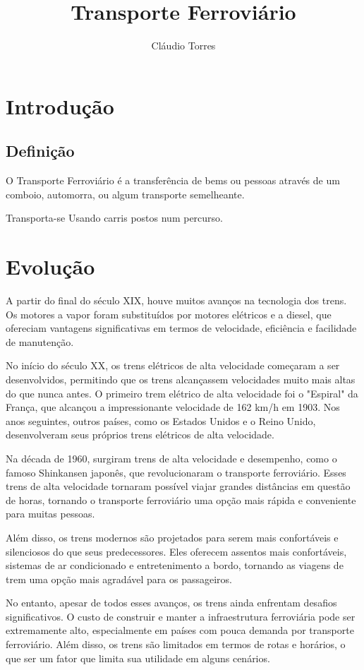 \documentclass{report}
\author{Cl\'audio Torres}
\title{Transporte Ferroviário}
\begin{document}
\maketitle
\section{Introdu\c c\~ao}
\subsection{Defini\c c\~ao}
O Transporte Ferroviário \' e a transferência de bems ou pessoas atrav\' es de um comboio, automorra, ou algum transporte semelheante.

Transporta-se Usando carris postos num percurso.
\section{Evolu\c c\~ao}
A partir do final do século XIX, houve muitos avanços na tecnologia dos trens. Os motores a vapor foram substituídos por motores elétricos e a diesel, que ofereciam vantagens significativas em termos de velocidade, eficiência e facilidade de manutenção.

No início do século XX, os trens elétricos de alta velocidade começaram a ser desenvolvidos, permitindo que os trens alcançassem velocidades muito mais altas do que nunca antes. O primeiro trem elétrico de alta velocidade foi o "Espiral" da França, que alcançou a impressionante velocidade de 162 km/h em 1903. Nos anos seguintes, outros países, como os Estados Unidos e o Reino Unido, desenvolveram seus próprios trens elétricos de alta velocidade.

Na década de 1960, surgiram trens de alta velocidade e desempenho, como o famoso Shinkansen japonês, que revolucionaram o transporte ferroviário. Esses trens de alta velocidade tornaram possível viajar grandes distâncias em questão de horas, tornando o transporte ferroviário uma opção mais rápida e conveniente para muitas pessoas.

Além disso, os trens modernos são projetados para serem mais confortáveis e silenciosos do que seus predecessores. Eles oferecem assentos mais confortáveis, sistemas de ar condicionado e entretenimento a bordo, tornando as viagens de trem uma opção mais agradável para os passageiros.

No entanto, apesar de todos esses avanços, os trens ainda enfrentam desafios significativos. O custo de construir e manter a infraestrutura ferroviária pode ser extremamente alto, especialmente em países com pouca demanda por transporte ferroviário. Além disso, os trens são limitados em termos de rotas e horários, o que ser um fator que limita sua utilidade em alguns cen\'arios.
\newpage
\end{document}
